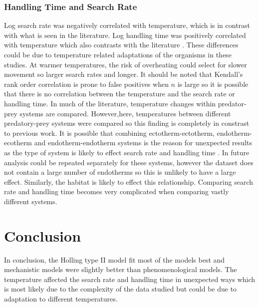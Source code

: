 \documentclass{article}
\begin{document}
\subsubsection{Handling Time and Search Rate}
Log search rate was negatively correlated with temperature, which is in contrast with what is seen in the literature\cite{Thompson1978TowardsElegans,Zamani2006Temperature-dependentAphid,Sentis2012UsingEfficiency,Gilioli2005TemperatureIndividuals,Dell2014TemperatureStrategy,Englund2011TemperatureResponse}. Log handling time was positively correlated with temperature which also contrasts with the literature \cite{Dell2014TemperatureStrategy,Thompson1978TowardsElegans,McCoull1998EffectNaucoridae,Jalali2010EffectPersicae,Zamani2006Temperature-dependentAphid,Sentis2012UsingEfficiency}.  
These differences could be due to temperature related adaptations of the organisms in these studies. At warmer temperatures, the risk of overheating could select for slower movement so larger search rates and longer. It should be noted that Kendall's rank order correlation is prone to false positives when $n$ is large \cite{Dytham2011ChoosingEdition} so it is possible that there is no correlation between the temperature and the search rate or handling time.
In much of the literature, temperature changes within predator-prey systems are compared. However,here, temperatures between different predatory-prey systems were compared so this finding is completely in constrast to previous work. 
It is possible that combining ectotherm-ectotherm, endotherm-ecotherm and endotherm-endotherm systems is the reason for unexpected results as the type of system is likely to effect search rate and handling time \cite{Dell2014TemperatureStrategy}. In future analysis could be repeated separately for these systems, however the dataset does not contain a large number of endotherms so this is unlikely to have a large effect. Similarly, the habitat is likely to effect this relationship\cite{Dell2014TemperatureStrategy}. Comparing search rate and handling time becomes very complicated when comparing vastly different systems. 
 \\
 \section{Conclusion}
In conclusion, the Holling type II model fit most of the models best and mechanistic models were slightly better than phenomenological models. The temperature affected the search rate and handling time in unexpected ways which is most likely due to the complexity of the data studied but could be due to adaptation to different temperatures.

\clearpage{}

\printbibliography
\end{document}
